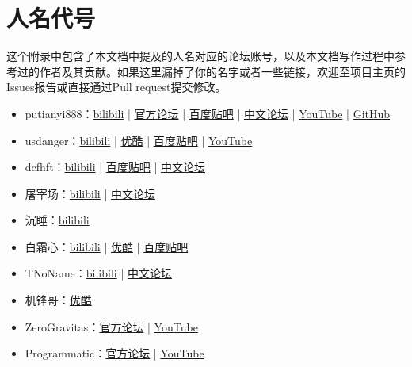 \chapter{人名代号}
这个附录中包含了本文档中提及的人名对应的论坛账号，以及本文档写作过程中参考过的作者及其贡献。如果这里漏掉了你的名字或者一些链接，欢迎至项目主页的Issues报告或直接通过Pull request提交修改。
\begin{itemize}
\item putianyi888：\href{https://space.bilibili.com/34937101}{bilibili} | \href{https://forums.terraria.org/index.php?members/putianyi888.121300/}{官方论坛} | \href{http://tieba.baidu.com/home/main?un=putianyi888}{百度贴吧} | \href{https://www.bbstr.net/members/putianyi888.342/}{中文论坛} | \href{https://www.youtube.com/channel/UCsG1EimffDYWXBoZRekcMIA}{YouTube} | \href{https://github.com/putianyi889}{GitHub}
\item usdanger：\href{https://space.bilibili.com/34637318/}{bilibili} | \href{http://i.youku.com/u/UMTcyMDA1MTY4}{优酷} | \href{http://tieba.baidu.com/home/main?un=us_danger}{百度贴吧} | \href{https://www.youtube.com/channel/UCh_cLX4iAbM6tAIl0zu3elw}{YouTube}
\item dcfhft：\href{https://space.bilibili.com/98605295/}{bilibili} | \href{http://tieba.baidu.com/home/main?un=dcfhft}{百度贴吧} | \href{https://www.bbstr.net/members/dcfhft.135/}{中文论坛}
\item 屠宰场：\href{https://space.bilibili.com/35610991/}{bilibili} | \href{https://www.bbstr.net/members/room.357/}{中文论坛}
\item 沉睡：\href{https://space.bilibili.com/22871583/}{bilibili}
\item 白霜心：\href{https://space.bilibili.com/49886444/}{bilibili} | \href{http://i.youku.com/u/UMTMyOTg1ODM4OA}{优酷} | \href{http://tieba.baidu.com/home/main?un=白霜心}{百度贴吧}
\item TNoName：\href{https://space.bilibili.com/14462041/}{bilibili} | \href{https://www.bbstr.net/members/tnoname.423/}{中文论坛}
\item 机锋哥：\href{http://i.youku.com/u/UMjg3MTI2NDcwOA}{优酷}
\item ZeroGravitas：\href{https://forums.terraria.org/index.php?members/zerogravitas.96/}{官方论坛} | \href{https://www.youtube.com/channel/UCyLQbVwYleCYzgl49dNAeOw}{YouTube}
\item Programmatic：\href{https://forums.terraria.org/index.php?members/programmatic.37545/}{官方论坛} | \href{https://www.youtube.com/channel/UCWGTYKTR5Kw3cDhyd2vIDew}{YouTube}

\end{itemize}
